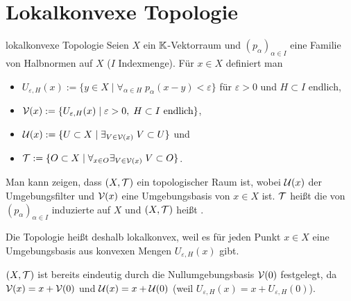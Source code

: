 \pagebreak

\section{%
    Lokalkonvexe Topologie%
}

\begin{Def}{lokalkonvexe Topologie}
    Seien $X$ ein $\mathbb{K}$-Vektorraum und $(p_\alpha)_{\alpha \in I}$ eine Familie von
    Halbnormen auf $X$ ($I$ Indexmenge).
    Für $x \in X$ definiert man
    \begin{itemize}
        \item
        $U_{\varepsilon,H}(x) := \{y \in X \;|\; \forall_{\alpha \in H}\;
        p_\alpha(x - y) < \varepsilon\}$
        für $\varepsilon > 0$ und $H \subset I$ endlich,

        \item
        $\mathcal{V}(x) := \{U_{\varepsilon,H}(x) \;|\; \varepsilon > 0,\; H \subset I \text{ endlich}\}$,

        \item
        $\mathcal{U}(x) := \{U \subset X \;|\; \exists_{V \in \mathcal{V}(x)}\; V \subset U\}$ und

        \item
        $\mathcal{T} := \{O \subset X \;|\; \forall_{x \in O} \exists_{V \in \mathcal{V}(x)}\; V \subset O\}$.
    \end{itemize}
    Man kann zeigen, dass $(X, \mathcal{T})$ ein topologischer Raum ist,
    wobei $\mathcal{U}(x)$ der Umgebungsfilter und $\mathcal{V}(x)$ eine Umgebungsbasis von $x \in X$ ist.
    $\mathcal{T}$ heißt die von $(p_\alpha)_{\alpha \in I}$ induzierte 
    auf $X$ und $(X, \mathcal{T})$ heißt .
\end{Def}

\begin{Bem}
    Die Topologie heißt deshalb lokalkonvex, weil es für jeden Punkt $x \in X$ eine
    Umgebungsbasis aus konvexen Mengen $U_{\varepsilon,H}(x)$ gibt.
\end{Bem}

\begin{Bem}
    $(X, \mathcal{T})$ ist bereits eindeutig durch die Nullumgebungsbasis $\mathcal{V}(0)$ festgelegt,
    da $\mathcal{V}(x) = x + \mathcal{V}(0)$ und $\mathcal{U}(x) = x + \mathcal{U}(0)$
    (weil $U_{\varepsilon,H}(x) = x + U_{\varepsilon,H}(0)$).
\end{Bem}

\linie

